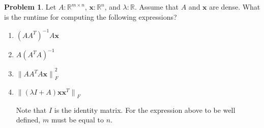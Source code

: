 \documentclass[10pt]{article}
\theoremstyle{definition}
\newtheorem{problem}{Problem}
\newcommand{\R}{\mathbb R}
\newcommand{\trans}[1]{{#1}^{T}}
\newcommand{\x}{\mathbf x}
\newcommand{\lF}[1]{{\lVert {#1} \rVert}_F}
\begin{document}
\newpage
\begin{problem}
    Let $A : \R^{m \times n}$, $\x : \R^n$, and $\lambda : \R$.
    Assume that $A$ and $\x$ are dense.
    What is the runtime for computing the following expressions?
    \begin{enumerate}
        \item $(A \trans A)^{-1} A \x$
            \vspace{4in}
            \newpage
        \item $A (\trans A A)^{-1}$
            \vspace{4in}
            \newpage
        \item $\lF{A \trans A A \x}^2$
            \vspace{4in}
            \newpage
        \item $\lF{(\lambda I + A) \x \trans \x}$

            Note that $I$ is the identity matrix.
            For the expression above to be well defined, $m$ must be equal to $n$.
            \vspace{4in}
    \end{enumerate}
\end{problem}


%
\end{document}
